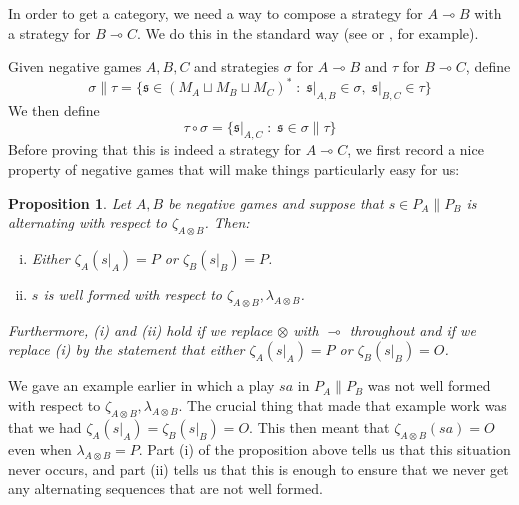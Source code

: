 \documentclass[11pt]{article} %
\theoremstyle{plain} %
\newtheorem{proposition}[theorem]{Proposition}
\theoremstyle{definition} %
\theoremstyle{exercisestyle}
\newcommand{\tensor}{\otimes}
\renewcommand{\implies}{\multimap}
\newcommand{\comp}[2]{#1 \circ #2}
\newcommand{\cprd}{\sqcup}
\newcommand{\suchthat}{\;\colon\;}
\newcommand{\s}{\mathfrak s}
\begin{document}
In order to get a category, we need a way to compose a strategy for $A\implies B$ with a strategy for $B\implies C$.  We do this in the standard way (see \cite{joyalgames} or \cite{martinsthesis}, for example).  

Given negative games $A,B,C$ and strategies $\sigma$ for $A\implies B$ and $\tau$ for $B\implies C$, define
\[
  \sigma\|\tau = \{\s\in(M_A\cprd M_B\cprd M_C)^*\suchthat \s\vert_{A,B}\in \sigma,\;\s\vert_{B,C}\in\tau\}
  \]
We then define
\[
  \comp\tau\sigma = \{\s\vert_{A,C}\suchthat\s\in\sigma\|\tau\}
  \]
Before proving that this is indeed a strategy for $A\implies C$, we first record a nice property of negative games that will make things particularly easy for us:

\begin{proposition}
  Let $A,B$ be negative games and suppose that $s\in P_A\|P_B$ is alternating with respect to $\zeta_{A\tensor B}$.  Then:
  \begin{enumerate}[i)]
    \item Either $\zeta_{A}(s\vert_A)=P$ or $\zeta_{B}(s\vert_B)=P$.  
    \item $s$ is well formed with respect to $\zeta_{A\tensor B},\lambda_{A\tensor B}$.  
  \end{enumerate}
  Furthermore, (i) and (ii) hold if we replace $\tensor$ with $\implies$ throughout and if we replace (i) by the statement that either $\zeta_A(s\vert_A)=P$ or $\zeta_B(s\vert_B)=O$.
  \label{nice-negative-games}
\end{proposition}

We gave an example earlier in which a play $sa$ in $P_A\|P_B$ was not well formed with respect to $\zeta_{A\tensor B},\lambda_{A\tensor B}$.  The crucial thing that made that example work was that we had $\zeta_A(s\vert_A)=\zeta_B(s\vert_B)=O$.  This then meant that $\zeta_{A\tensor B}(sa)=O$ even when $\lambda_{A\tensor B}=P$.  Part (i) of the proposition above tells us that this situation never occurs, and part (ii) tells us that this is enough to ensure that we never get any alternating sequences that are not well formed.
\end{document}
